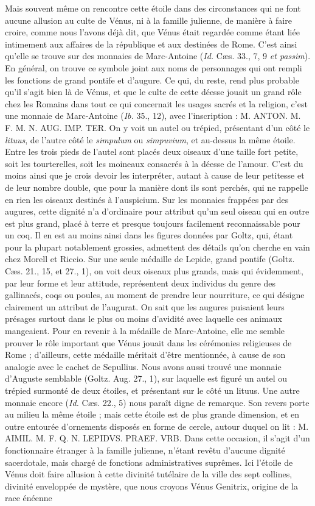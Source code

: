 \documentclass[a4paper, 11pt, oneside, polutonikogreek, french]{article}
\begin{document}
Mais souvent même on rencontre cette étoile dans des circonstances qui ne font aucune allusion au culte de Vénus, ni à la famille julienne, de manière à faire croire, comme nous l'avons déjà dit, que Vénus était regardée comme étant liée intimement aux affaires de la république et aux destinées de Rome. C'est ainsi qu'elle se trouve sur des monnaies de Marc-Antoine (\emph{Id.} Cæs. 33., 7, 9 \emph{et passim}). En général, on trouve ce symbole joint aux noms de personnages qui ont rempli les fonctions de grand pontife et d'augure. Ce qui, du reste, rend plus probable qu'il s'agit bien là de Vénus, et que le culte de cette déesse jouait un grand rôle chez les Romains dans tout ce qui concernait les usages sacrés et la religion, c'est une monnaie de Marc-Antoine (\emph{Ib.} 35., 12), avec l'inscription : M. ANTON. M. F. M. N. AUG. IMP. TER. On y voit un autel ou trépied, présentant d'un côté le \emph{lituus}, de l'autre côté le \emph{simpulum} ou \emph{simpuvium}, et au-dessus la même étoile. Entre les trois pieds de l'autel sont placés deux oiseaux d'une taille fort petite, soit les tourterelles, soit les moineaux consacrés à la déesse de l'amour. C'est du moins ainsi que je crois devoir les interpréter, autant à cause de leur petitesse et de leur nombre double, que pour la manière dont ils sont perchés, qui ne rappelle en rien les oiseaux destinés à l'auspicium. Sur les monnaies frappées par des augures, cette dignité n'a d'ordinaire pour attribut qu'un seul oiseau qui en outre est plus grand, placé à terre et presque toujours facilement reconnaissable pour un coq. Il en est au moins ainsi dans les figures données par Goltz, qui, étant pour la plupart notablement grossies, admettent des détails qu'on cherche en vain chez Morell et Riccio. Sur une seule médaille de Lepide, grand pontife (Goltz. Cæs. 21., 15, et 27., 1), on voit deux oiseaux plus grands, mais qui évidemment, par leur forme et leur attitude, représentent deux individus du genre des gallinacés, coqs ou poules, au moment de prendre leur nourriture, ce qui désigne clairement un attribut de l'augurat. On sait que les augures puisaient leurs présages surtout dans le plus ou moins d'avidité avec laquelle ces animaux mangeaient. Pour en revenir à la médaille de Marc-Antoine, elle me semble prouver le rôle important que Vénus jouait dans les cérémonies religieuses de Rome ; d'ailleurs, cette médaille méritait d'être mentionnée, à cause de son analogie avec le cachet de Sepullius. Nous avons aussi trouvé une monnaie d'Auguste semblable (Goltz. Aug. 27., 1), sur laquelle est figuré un autel ou trépied surmonté de deux étoiles, et présentant sur le côté un lituus. Une autre monnaie encore (\emph{Id.} Cæs. 22., 5) nous paraît digne de remarque. Son revers porte au milieu la même étoile ; mais cette étoile est de plus grande dimension, et en outre entourée d'ornements disposés en forme de cercle, autour duquel on lit : M. AIMIL. M. F. Q. N. LEPIDVS. PRAEF. VRB. Dans cette occasion, il s'agit d'un fonctionnaire étranger à la famille julienne, n'étant revêtu d'aucune dignité sacerdotale, mais chargé de fonctions administratives suprêmes. Ici l'étoile de Vénus doit faire allusion à cette divinité tutélaire de la ville des sept collines, divinité enveloppée de mystère, que nous croyons Vénus Genitrix, origine de la race énéenne 
\end{document}
